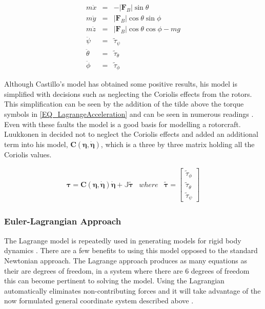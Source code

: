 \begin{eqnarray}
\label{EQ_LagrangeAcceleration}
m\ddot{x} &=& -\lvert \textbf{F}_B \rvert\sin\theta\\
m\ddot{y} &=& \lvert \textbf{F}_B \rvert\cos\theta\sin\phi\\
m\ddot{z} &=& \lvert \textbf{F}_B \rvert\cos\theta\cos\phi - mg\\
\ddot{\psi} &=& \tilde{\tau}_\psi\\
\ddot{\theta} &=& \tilde{\tau}_\theta\\
\ddot{\phi} &=& \tilde{\tau}_\phi
\end{eqnarray}

Although Castillo's model has obtained some positive results, his model is simplified with decisions such as neglecting the Coriolis effects from the rotors. This simplification can be seen by the addition of the tilde above the torque symbols in \ref{EQ_LagrangeAcceleration} and  can be seen in numerous readings \cite{MiniFlying, RealTime, Modelling}. Even with these faults the model is a good basis for modelling a rotorcraft. Luukkonen in \cite{Luukkonen} decided not to neglect the Coriolis effects and added an additional term into his model, $\textbf{C}(\boldsymbol{\eta}, \dot{\boldsymbol{\eta}})$, which is a three by three matrix holding all the Coriolis values. 

\begin{eqnarray}
\label{EQ_LagrangeAccelerationCoriolis}
\boldsymbol{\tau} = \textbf{C}(\boldsymbol{\eta}, \dot{\boldsymbol{\eta}})\dot{\boldsymbol{\eta}} + \mathbb{J}\tilde{\boldsymbol{\tau}} & where & \tilde{\boldsymbol{\tau}} = \begin{bmatrix}
\tilde{\tau}_\phi\\
\tilde{\tau}_\theta\\
\tilde{\tau}_\psi
\end{bmatrix}
\end{eqnarray}


\subsubsection{Euler-Lagrangian Approach}
The Lagrange model is repeatedly used in generating models for rigid body dynamics \cite{MIT, MiniFlying, Luukkonen, RealTime}. There are a few benefits to using this model opposed to the standard Newtonian approach. The Lagrange approach produces as many equations as their are degrees of freedom, in a system where there are 6 degrees of freedom this can become pertinent to solving the model. Using the Lagrangian automatically eliminates non-contributing forces and it will take advantage of the now formulated general coordinate system described above \cite{MIT}.

